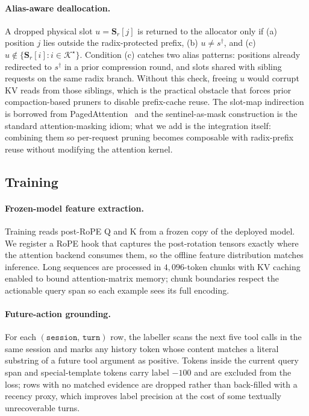 \documentclass[11pt]{article}
\begin{document}
\paragraph{Alias-aware deallocation.}
A dropped physical slot $u\!=\!\mathbf{S}_r[j]$ is returned to the
allocator only if (a) position $j$ lies outside the radix-protected
prefix, (b) $u\!\neq\!s^{\dagger}$, and (c) $u\notin
\{\mathbf{S}_r[i]:i\!\in\!\mathcal{K}^{\star}\}$. Condition (c)
catches two alias patterns: positions already redirected to
$s^{\dagger}$ in a prior compression round, and slots shared with
sibling requests on the same radix branch. Without this check,
freeing $u$ would corrupt KV reads from those siblings, which is
the practical obstacle that forces prior compaction-based pruners
to disable prefix-cache reuse. The slot-map indirection is
borrowed from PagedAttention~\citep{kwon2023efficient} and the sentinel-as-mask
construction is the standard attention-masking idiom; what we add
is the integration itself: combining them so per-request pruning
becomes composable with radix-prefix reuse without modifying the
attention kernel.

\subsection{Training}
\label{sec:method-train}

\paragraph{Frozen-model feature extraction.}
Training reads post-RoPE Q and K from a frozen copy of the deployed
model. We register a RoPE hook that captures the post-rotation
tensors exactly where the attention backend consumes them, so the
offline feature distribution matches inference. Long sequences are
processed in $4{,}096$-token chunks with KV caching enabled to
bound attention-matrix memory; chunk boundaries respect the
actionable query span so each example sees its full encoding.

\paragraph{Future-action grounding.}
For each $(\texttt{session},\,\texttt{turn})$ row, the labeller
scans the next five tool calls in the same session and marks any
history token whose content matches a literal substring of a future
tool argument as positive. Tokens inside the current query span and
special-template tokens carry label $-100$ and are excluded from
the loss; rows with no matched evidence are dropped rather than
back-filled with a recency proxy, which improves label precision at
the cost of some textually unrecoverable turns.
\end{document}
